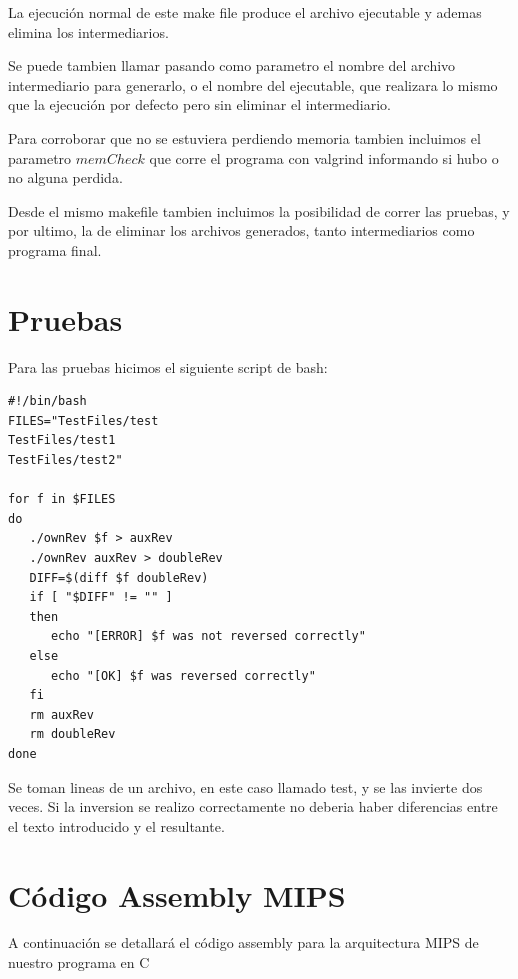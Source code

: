 \documentclass{article}
\begin{document}
La ejecución normal de este make file produce el archivo ejecutable y ademas elimina los intermediarios.

Se puede tambien llamar pasando como parametro el nombre del archivo intermediario para generarlo, o el nombre del ejecutable, que realizara lo mismo que la ejecución por defecto pero sin eliminar el intermediario.

Para corroborar que no se estuviera perdiendo memoria tambien incluimos el parametro \(memCheck\) que corre el programa con valgrind informando si hubo o no alguna perdida.

Desde el mismo makefile tambien incluimos la posibilidad de correr las pruebas, y por ultimo, la de eliminar los archivos generados, tanto intermediarios como programa final.

\section{Pruebas}

Para las pruebas hicimos el siguiente script de bash:

\begin{verbatim}
#!/bin/bash
FILES="TestFiles/test
TestFiles/test1
TestFiles/test2"

for f in $FILES
do
   ./ownRev $f > auxRev
   ./ownRev auxRev > doubleRev
   DIFF=$(diff $f doubleRev)
   if [ "$DIFF" != "" ] 
   then
      echo "[ERROR] $f was not reversed correctly"
   else
      echo "[OK] $f was reversed correctly"
   fi
   rm auxRev
   rm doubleRev
done
\end{verbatim}

Se toman lineas de un archivo, en este caso llamado test, y se las invierte dos veces. Si la inversion se realizo correctamente no deberia haber diferencias entre el texto introducido y el resultante.

\section{C\'odigo Assembly MIPS}
A continuaci\'on se detallará el c\'odigo assembly para la arquitectura MIPS de nuestro programa en C
\end{document}
